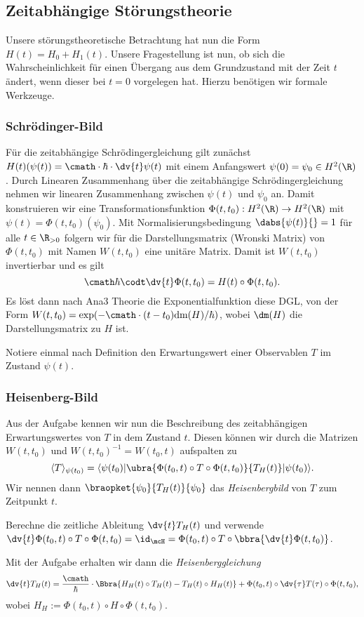 \documentclass{subfiles}
\begin{document}
    \subsection{Zeitabhängige Störungstheorie}
        Unsere störungstheoretische Betrachtung hat nun die Form $H(t) = H_0 + H_1(t)$. Unsere Fragestellung ist nun, ob sich die Wahrscheinlichkeit für einen Übergang aus dem Grundzustand mit der Zeit $t$ ändert, wenn dieser bei $t = 0$ vorgelegen hat. Hierzu benötigen wir formale Werkzeuge.
        \subsubsection*{Schrödinger-Bild}
            Für die zeitabhängige Schrödingergleichung gilt zunächst $H(t)(\psi(t)) = \cmath\cdot\hbar\cdot\dv{t}\psi(t)$ mit einem Anfangswert $\psi(0) = \psi_0\in H^2(\R)$. Durch Linearen Zusammenhang über die zeitabhängige Schrödingergleichung nehmen wir linearen Zusammenhang zwischen $\psi(t)$ und $\psi_0$ an. Damit konstruieren wir eine Transformationsfunktion $\Phi(t,t_0):H^2(\R)\to H^2(\R)$ mit $\psi(t) = \Phi(t,t_0)(\psi_0)$. Mit Normalisierungsbedingung $\dabs{\psi(t)}{} = 1$ für alle $t\in\R_{>0}$ folgern wir für die Darstellungsmatrix (Wronski Matrix) von $\Phi(t,t_0)$ mit Namen $W(t,t_0)$ eine unitäre Matrix. Damit ist $W(t,t_0)$ invertierbar und es gilt
            \[
                \cmath\hbar\codt\dv{t}\Phi(t,t_0) = H(t)\circ \Phi(t,t_0).
            \]
            Es löst dann nach Ana3 Theorie die Exponentialfunktion diese DGL, von der Form $W(t,t_0) = \exp(-\cmath\cdot (t-t_0)\text{dm}(H)/\hbar)$, wobei $\dm(H)$ die Darstellungsmatrix zu $H$ ist. 
            \begin{Aufgabe}
                \nr{} Notiere einmal nach Definition den Erwartungswert einer Observablen $T$ im Zustand $\psi(t)$. 
            \end{Aufgabe}

        \subsubsection*{Heisenberg-Bild}    
            Aus der Aufgabe kennen wir nun die Beschreibung des zeitabhängigen Erwartungswertes von $T$ in dem Zustand $t$. Diesen können wir durch die Matrizen $W(t,t_0)$ und $W(t,t_0)^{-1} = W(t_0,t)$ aufspalten zu 
            \[
                \langle T\rangle_{\psi(t_0)} = \langle\psi(t_0)|\ubra{\Phi(t_0,t)\circ T\circ \Phi(t,t_0)}{T_H(t)}|\psi(t_0)\rangle.
            \]
            Wir nennen dann $\braopket{\psi_0}{T_H(t)}{\psi_0}$ das \emph{Heisenbergbild} von $T$ zum Zeitpunkt $t$. 
            \begin{Aufgabe}
                \nr{} Berechne die zeitliche Ableitung $\dv{t}T_H(t)$ und verwende $\dv{t}\Phi(t_0,t)\circ T\circ\Phi(t,t_0) = \id_\mcH = \Phi(t_0,t)\circ T\circ \bbra{\dv{t}\Phi(t,t_0)}$. 
            \end{Aufgabe}
            Mit der Aufgabe erhalten wir dann die \emph{Heisenberggleichung}
            \[
                \dv{t}T_H(t) = \frac{\cmath}{\hbar}\cdot \Bbra{H_H(t)\circ T_H(t) - T_H(t)\circ H_H(t)} + \Phi(t_0,t)\circ\dv{\tau}T(\tau)\circ\Phi(t,t_0),
            \]
            wobei $H_H := \Phi(t_0,t)\circ H\circ\Phi(t,t_0)$. 
\end{document}
